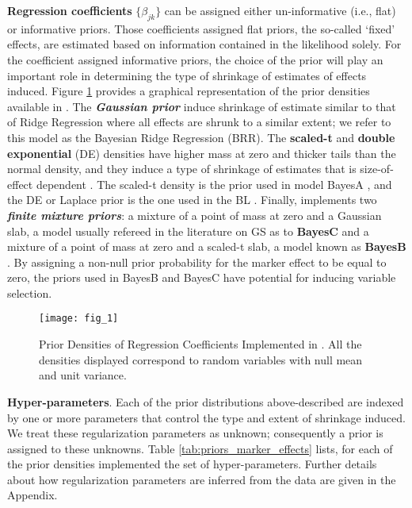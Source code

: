 \documentclass[article,shortnames,nojss]{jss}
\begin{document}
\textbf{Regression coefficients} $\{\beta_{jk}\}$ can be assigned either 
un-informative (i.e., flat) or informative priors. Those coefficients 
assigned flat priors, the so-called `fixed' effects, are estimated based on 
information contained in the likelihood solely. For the coefficient 
assigned informative priors, the choice of the prior will play an important 
role in determining the type of shrinkage of estimates of effects induced. 
Figure \ref{fig:prior_densities} provides a graphical representation of the prior 
densities available in . 
The \textbf{\emph{Gaussian prior}} induce shrinkage of estimate similar to that of Ridge Regression 
\citep[\textbf{RR},][]{Hoerl:1970} where all effects are shrunk to a 
similar extent; we refer to this model as the Bayesian 
Ridge Regression (BRR). The \textbf{scaled-t} 
and \textbf{double exponential} (DE) densities have higher mass at zero 
and thicker tails than the normal density, and they induce a type of 
shrinkage of estimates that is size-of-effect dependent \citep{Gianola:2013}. The 
scaled-t density is the prior used in model 
BayesA \citep{Meuwissen:2001}, and the DE or 
Laplace prior is the one used in the BL \citep{Park:2008}. 
Finally,  implements two \textbf{\emph{finite mixture priors}}: a mixture of 
a point of mass at zero and a Gaussian slab, a model usually 
refereed in the literature on GS as to \textbf{BayesC} \citep{Habier:2011} 
and a mixture of a point of mass at zero and a scaled-t slab, a 
model known as \textbf{BayesB} \citep{Meuwissen:2001}. By assigning a 
non-null prior probability for the marker effect to be equal to zero, 
the priors used in BayesB and BayesC have potential 
for inducing variable selection.

\begin{figure}[!htb]
  \centering
  \texttt{[image: fig\_1]}
  \caption{Prior Densities of Regression Coefficients Implemented in . All the densities displayed correspond to random variables with null mean and unit variance.}
  \label{fig:prior_densities}
\end{figure}


\textbf{Hyper-parameters}. Each of the prior distributions 
above-described  are indexed by one or more parameters that control 
the type and extent of shrinkage induced. We treat these 
regularization parameters as unknown; consequently a prior 
is assigned to these unknowns. Table \ref{tab:priors_marker_effects} 
lists, for each of the prior densities implemented the set of hyper-parameters. 
Further details about how regularization parameters are inferred 
from the data are given in the Appendix. 
\end{document}
